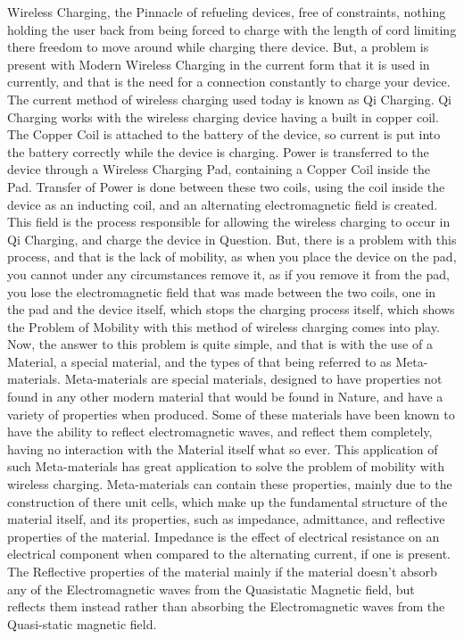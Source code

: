 \documentclass[]{article}
\begin{document}
Wireless Charging, the Pinnacle of refueling devices, free of constraints, nothing holding the user back from being forced to charge with the length of cord limiting there freedom to move around while charging there device. But, a problem is present with Modern Wireless Charging in the current form that it is used in currently, and that is the need for a connection constantly to charge your device. The current method of wireless charging used today is known as Qi Charging. Qi Charging works with the wireless charging device having a built in copper coil. The Copper Coil is attached to the battery of the device, so current is put into the battery correctly while the device is charging. Power is transferred to the device through a Wireless Charging Pad, containing a Copper Coil inside the Pad. Transfer of Power is done between these two coils, using the coil inside the device as an inducting coil, and an alternating electromagnetic field is created. This field is the process responsible for allowing the wireless charging to occur in Qi Charging, and charge the device in Question. But, there is a problem with this process, and that is the lack of mobility, as when you place the device on the pad, you cannot under any circumstances remove it, as if you remove it from the pad, you lose the electromagnetic field that was made between the two coils, one in the pad and the device itself, which stops the charging process itself, which shows the Problem of Mobility with this method of wireless charging comes into play. Now, the answer to this problem is quite simple, and that is with the use of a Material, a special material, and the types of that being referred to as Meta-materials. Meta-materials are special materials, designed to have properties not found in any other modern material that would be found in Nature, and have a variety of properties when produced. Some of these materials have been known to have the ability to reflect electromagnetic waves, and reflect them completely, having no interaction with the Material itself what so ever. This application of such Meta-materials has great application to solve the problem of mobility with wireless charging. Meta-materials can contain these properties, mainly due to the construction of there unit cells, which make up the fundamental structure of the material itself, and its properties, such as impedance, admittance, and reflective properties of the material. Impedance is the effect of electrical resistance on an electrical component when compared to the alternating current, if one is present. The Reflective properties of the material mainly if the material doesn't absorb any of the Electromagnetic waves from the Quasistatic Magnetic field, but reflects them instead rather than absorbing the Electromagnetic waves from the Quasi-static magnetic field.
\end{document}
